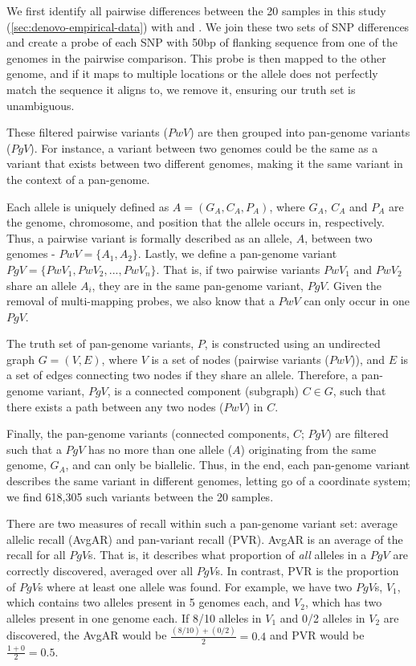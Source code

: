 We first identify all pairwise differences between the 20 samples in this study (\autoref{sec:denovo-empirical-data}) with  \cite{mummer2018} and  \cite{li2018}. We join these two sets of SNP differences and create a probe of each SNP with 50bp of flanking sequence from one of the genomes in the pairwise comparison. This probe is then mapped to the other genome, and if it maps to multiple locations or the allele does not perfectly match the sequence it aligns to, we remove it, ensuring our truth set is unambiguous.

These filtered pairwise variants ($PwV$) are then grouped into pan-genome variants ($PgV$). For instance, a variant between two genomes could be the same as a variant that exists between two different genomes, making it the same variant in the context of a pan-genome.

Each allele is uniquely defined as $A=(G_A,C_A,P_A)$, where $G_A$, $C_A$ and $P_A$ are the genome, chromosome, and position that the allele occurs in, respectively. Thus, a pairwise variant is formally described as an allele, $A$, between two genomes - $PwV=\{A_1,A_2\}$. Lastly, we define a pan-genome variant $PgV=\{PwV_1,PwV_2,...,PwV_n\}$. That is, if two pairwise variants $PwV_1$ and $PwV_2$ share an allele $A_i$, they are in the same pan-genome variant, $PgV$. Given the removal of multi-mapping probes, we also know that a $PwV$ can only occur in one $PgV$.

The truth set of pan-genome variants, $P$, is constructed using an undirected graph $G=(V,E)$, where $V$ is a set of nodes (pairwise variants ($PwV$)), and $E$ is a set of edges connecting two nodes if they share an allele. Therefore, a pan-genome variant, $PgV$, is a connected component (subgraph) $C \in G$, such that there exists a path between any two nodes ($PwV$) in $C$.

Finally, the pan-genome variants (connected components, $C$; $PgV$) are filtered such that a $PgV$ has no more than one allele ($A$) originating from the same genome, $G_A$, and can only be biallelic. Thus, in the end, each pan-genome variant describes the same variant in different genomes, letting go of a coordinate system; we find 618,305 such variants between the 20 samples.

\noindent
There are two measures of recall within such a pan-genome variant set: average allelic recall (AvgAR) and pan-variant recall (PVR). AvgAR is an average of the recall for all $PgV$s. That is, it describes what proportion of \emph{all} alleles in a $PgV$ are correctly discovered, averaged over all $PgV$s. In contrast, PVR is the proportion of $PgV$s where at least one allele was found. For example, we have two $PgV$s,  $V_1$, which contains two alleles present in 5 genomes each, and $V_2$, which has two alleles present in one genome each. If 8/10 alleles in $V_1$ and 0/2 alleles in $V_2$ are discovered, the AvgAR would be $\frac{(8/10)+(0/2)}{2}=0.4$ and PVR would be $\frac{1+0}{2}=0.5$.